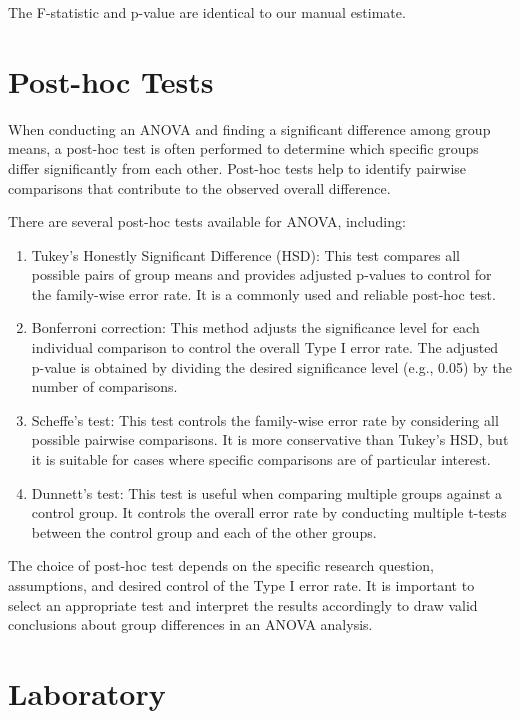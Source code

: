 \documentclass[
]{book}
\begin{document}
The F-statistic and p-value are identical to our manual estimate.

\hypertarget{post-hoc-tests}{%
\section{Post-hoc Tests}\label{post-hoc-tests}}

When conducting an ANOVA and finding a significant difference among group means, a post-hoc test is often performed to determine which specific groups differ significantly from each other. Post-hoc tests help to identify pairwise comparisons that contribute to the observed overall difference.

There are several post-hoc tests available for ANOVA, including:

\begin{enumerate}
\def\labelenumi{\arabic{enumi}.}
\item
  Tukey's Honestly Significant Difference (HSD): This test compares all possible pairs of group means and provides adjusted p-values to control for the family-wise error rate. It is a commonly used and reliable post-hoc test.
\item
  Bonferroni correction: This method adjusts the significance level for each individual comparison to control the overall Type I error rate. The adjusted p-value is obtained by dividing the desired significance level (e.g., 0.05) by the number of comparisons.
\item
  Scheffe's test: This test controls the family-wise error rate by considering all possible pairwise comparisons. It is more conservative than Tukey's HSD, but it is suitable for cases where specific comparisons are of particular interest.
\item
  Dunnett's test: This test is useful when comparing multiple groups against a control group. It controls the overall error rate by conducting multiple t-tests between the control group and each of the other groups.
\end{enumerate}

The choice of post-hoc test depends on the specific research question, assumptions, and desired control of the Type I error rate. It is important to select an appropriate test and interpret the results accordingly to draw valid conclusions about group differences in an ANOVA analysis.

\hypertarget{laboratory-4}{%
\section{Laboratory}\label{laboratory-4}}
\end{document}
